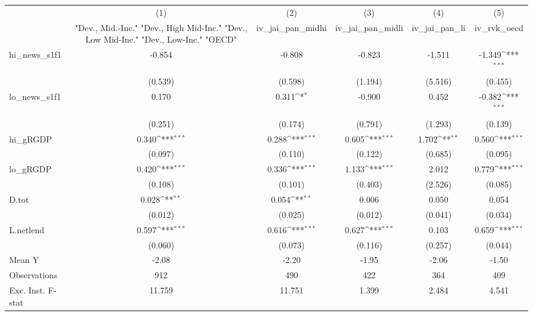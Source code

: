 {
\def\sym#1{\ifmmode^{#1}\else\(^{#1}\)\fi}
\begin{tabular}{l*{5}{c}}
\toprule
            &\multicolumn{1}{c}{(1)}&\multicolumn{1}{c}{(2)}&\multicolumn{1}{c}{(3)}&\multicolumn{1}{c}{(4)}&\multicolumn{1}{c}{(5)}\\
            &\multicolumn{1}{c}{ "Dev., Mid.-Inc." "Dev., High Mid-Inc." "Dev., Low Mid-Inc." "Dev., Low-Inc." "OECD" }&\multicolumn{1}{c}{iv\_jai\_pan\_midhi}&\multicolumn{1}{c}{iv\_jai\_pan\_midli}&\multicolumn{1}{c}{iv\_jai\_pan\_li}&\multicolumn{1}{c}{iv\_rvk\_oecd}\\
\midrule
hi\_news\_s1f1&      -0.854         &      -0.808         &      -0.823         &      -1.511         &      -1.349\sym{***}\\
            &     (0.539)         &     (0.598)         &     (1.194)         &     (5.516)         &     (0.455)         \\
\addlinespace
lo\_news\_s1f1&       0.170         &       0.311\sym{*}  &      -0.900         &       0.452         &      -0.382\sym{***}\\
            &     (0.251)         &     (0.174)         &     (0.791)         &     (1.293)         &     (0.139)         \\
\addlinespace
hi\_gRGDP    &       0.340\sym{***}&       0.288\sym{***}&       0.605\sym{***}&       1.702\sym{**} &       0.560\sym{***}\\
            &     (0.097)         &     (0.110)         &     (0.122)         &     (0.685)         &     (0.095)         \\
\addlinespace
lo\_gRGDP    &       0.420\sym{***}&       0.336\sym{***}&       1.133\sym{***}&       2.012         &       0.779\sym{***}\\
            &     (0.108)         &     (0.101)         &     (0.403)         &     (2.526)         &     (0.085)         \\
\addlinespace
D.tot       &       0.028\sym{**} &       0.054\sym{**} &       0.006         &       0.050         &       0.054         \\
            &     (0.012)         &     (0.025)         &     (0.012)         &     (0.041)         &     (0.034)         \\
\addlinespace
L.netlend   &       0.597\sym{***}&       0.616\sym{***}&       0.627\sym{***}&       0.103         &       0.659\sym{***}\\
            &     (0.060)         &     (0.073)         &     (0.116)         &     (0.257)         &     (0.044)         \\
\midrule
Mean Y      &       -2.08         &       -2.20         &       -1.95         &       -2.06         &       -1.50         \\
Observations&         912         &         490         &         422         &         364         &         409         \\
Exc. Inst. F-stat&      11.759         &      11.751         &       1.399         &       2.484         &       4.541         \\
\bottomrule
\end{tabular}
}
